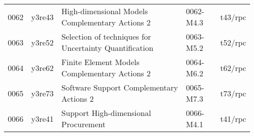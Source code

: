 \begin{landscape}
\begin{longtable}{|p{0.8cm}|p{1.4cm}|p{10.0cm}|p{2.2cm}|p{1.2cm}|}
0062 & y3re43\cite{y3re43} & High-dimensional Models Complementary Actions 2 &  0062-M4.3 & t43/rpc \\
0063 & y3re52\cite{y3re52} & Selection of techniques for Uncertainty Quantification & 0063-M5.2 & t52/rpc \\
0064 & y3re62\cite{y3re62} & Finite Element Models Complementary Actions 2 &  0064-M6.2 & t62/rpc \\
0065 & y3re73\cite{y3re73} & Software Support Complementary Actions 2 &  0065-M7.3 & t73/rpc \\
0066 & y3re41\cite{y3re41} & Support High-dimensional Procurement & 0066-M4.1 & t41/rpc \\
\hline
\end{longtable}
\end{landscape}
